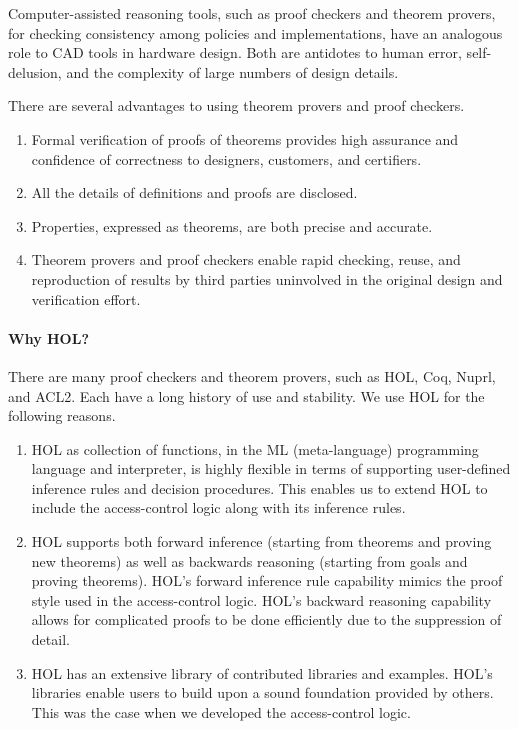 Computer-assisted reasoning tools, such as proof checkers and theorem
provers, for checking consistency among policies and implementations,
have an analogous role to CAD tools in hardware design. Both are
antidotes to human error, self-delusion, and the complexity of large
numbers of design details. 

There are several advantages to using theorem provers and proof checkers.
\begin{enumerate}
\item Formal verification of proofs of theorems provides high
  assurance and confidence of correctness to designers, customers, and
  certifiers.
\item All the details of definitions and proofs are disclosed.
\item Properties, expressed as theorems, are both precise and
  accurate.
\item Theorem provers and proof checkers enable rapid checking, reuse,
  and reproduction of results by third parties uninvolved in the
  original design and verification effort.
\end{enumerate}

\paragraph*{Why HOL?}

There are many proof checkers and theorem provers, such as HOL, Coq,
Nuprl, and ACL2. Each have a long history of use and stability. We use
HOL for the following reasons.
\begin{enumerate}
\item HOL as collection of functions, in the ML (meta-language)
  programming language and interpreter, is highly flexible in terms of
  supporting user-defined inference rules and decision
  procedures. This enables us to extend HOL to include the
  access-control logic along with its inference rules.
\item HOL supports both forward inference (starting from theorems and
  proving new theorems) as well as backwards reasoning (starting from
  goals and proving theorems). HOL's forward inference rule capability
  mimics the proof style used in the access-control logic. HOL's
  backward reasoning capability allows for complicated proofs to be
  done efficiently due to the suppression of detail.
\item HOL has an extensive library of contributed libraries and
  examples. HOL's libraries enable users to build upon a sound
  foundation provided by others. This was the case when we developed
  the access-control logic.
\end{enumerate}

